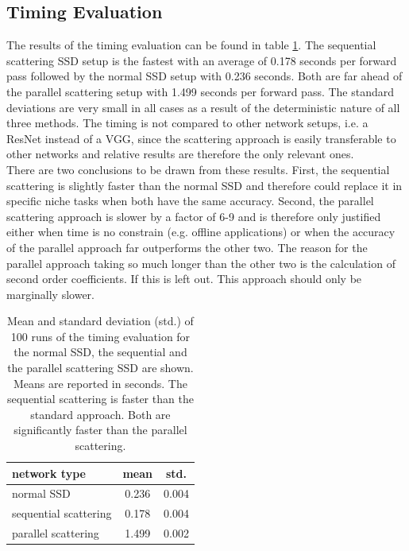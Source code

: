 \subsection{Timing Evaluation}
\label{subsec:timing_evaluation_results}

The results of the timing evaluation can be found in table \ref{table:timing_evaluation}. The sequential scattering SSD setup is the fastest with an average of 0.178 seconds per forward pass followed by the normal SSD setup with 0.236 seconds. Both are far ahead of the parallel scattering setup with 1.499 seconds per forward pass. The standard deviations are very small in all cases as a result of the deterministic nature of all three methods. The timing is not compared to other network setups, i.e. a ResNet instead of a VGG, since the scattering approach is easily transferable to other networks and relative results are therefore the only relevant ones. \\
There are two conclusions to be drawn from these results. First, the sequential scattering is slightly faster than the normal SSD and therefore could replace it in specific niche tasks when both have the same accuracy. Second, the parallel scattering approach is slower by a factor of 6-9 and is therefore only justified either when time is no constrain (e.g. offline applications) or when the accuracy of the parallel approach far outperforms the other two. The reason for the parallel approach taking so much longer than the other two is the calculation of second order coefficients. If this is left out. This approach should only be marginally slower.

\begin{table}[!htb]
	\centering
	\caption{Mean and standard deviation (std.) of 100 runs of the timing evaluation for the normal SSD, the sequential and the parallel scattering SSD are shown. Means are reported in seconds. The sequential scattering is faster than the standard approach. Both are significantly faster than the parallel scattering.}
	\begin{tabular}{lcc}
		\toprule
		network type & mean & std. \\
		\midrule
		normal SSD & 0.236 & 0.004 \\
		sequential scattering & 0.178 & 0.004 \\
		parallel scattering & 1.499 & 0.002 \\
		\bottomrule
	\end{tabular}
	\label{table:timing_evaluation}
\end{table}
